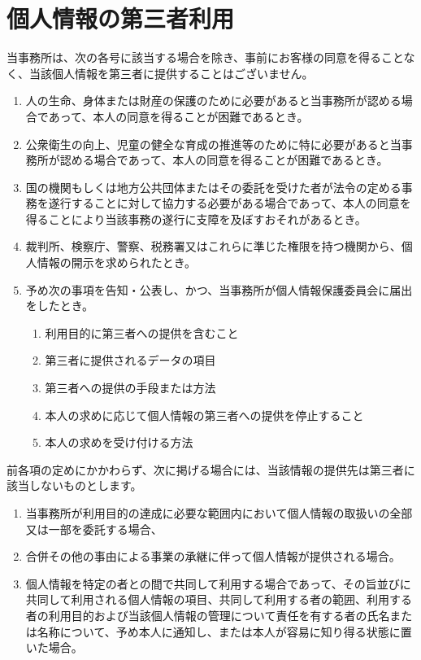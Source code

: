 \documentclass[a4j,titlepage]{ltjsarticle}
\begin{document}
\section{個人情報の第三者利用}
当事務所は、次の各号に該当する場合を除き、事前にお客様の同意を得ることなく、当該個人情報を第三者に提供することはございません。
\begin{enumerate}
\item 人の生命、身体または財産の保護のために必要があると当事務所が認める場合であって、本人の同意を得ることが困難であるとき。
\item 公衆衛生の向上、児童の健全な育成の推進等のために特に必要があると当事務所が認める場合であって、本人の同意を得ることが困難であるとき。
\item 国の機関もしくは地方公共団体またはその委託を受けた者が法令の定める事務を遂行することに対して協力する必要がある場合であって、本人の同意を得ることにより当該事務の遂行に支障を及ぼすおそれがあるとき。
\item 裁判所、検察庁、警察、税務署又はこれらに準じた権限を持つ機関から、個人情報の開示を求められたとき。
\item 予め次の事項を告知・公表し、かつ、当事務所が個人情報保護委員会に届出をしたとき。
\begin{enumerate}
	\item 利用目的に第三者への提供を含むこと
	\item 第三者に提供されるデータの項目
	\item 第三者への提供の手段または方法
	\item 本人の求めに応じて個人情報の第三者への提供を停止すること
	\item 本人の求めを受け付ける方法
\end{enumerate}
\end {enumerate}


前各項の定めにかかわらず、次に掲げる場合には、当該情報の提供先は第三者に該当しないものとします。
\begin{enumerate}
	\item 当事務所が利用目的の達成に必要な範囲内において個人情報の取扱いの全部又は一部を委託する場合、
	\item 合併その他の事由による事業の承継に伴って個人情報が提供される場合。
	\item 個人情報を特定の者との間で共同して利用する場合であって、その旨並びに共同して利用される個人情報の項目、共同して利用する者の範囲、利用する者の利用目的および当該個人情報の管理について責任を有する者の氏名または名称について、予め本人に通知し、または本人が容易に知り得る状態に置いた場合。
\end{enumerate}
\end{document}

